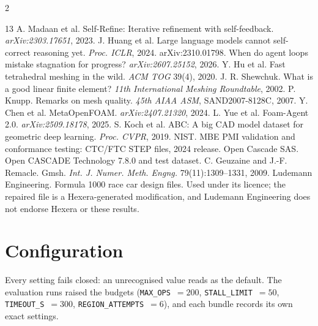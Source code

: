 \documentclass[10pt,onecolumn]{article}
\newcommand{\code}[1]{\texttt{\small #1}}
\begin{document}
\begin{multicols}{2}
\begin{thebibliography}{13}
\footnotesize
\setlength{\itemsep}{2pt}
 A. Madaan et al. Self-Refine: Iterative refinement with self-feedback.
  \emph{arXiv:2303.17651}, 2023.
 J. Huang et al. Large language models cannot self-correct reasoning yet.
  \emph{Proc. ICLR}, 2024. arXiv:2310.01798.
 When do agent loops mistake stagnation for progress? \emph{arXiv:2607.25152}, 2026.
 Y. Hu et al. Fast tetrahedral meshing in the wild. \emph{ACM TOG} 39(4), 2020.
 J. R. Shewchuk. What is a good linear finite element? \emph{11th International
  Meshing Roundtable}, 2002.
 P. Knupp. Remarks on mesh quality. \emph{45th AIAA ASM}, SAND2007-8128C, 2007.
 Y. Chen et al. MetaOpenFOAM. \emph{arXiv:2407.21320}, 2024.
 L. Yue et al. Foam-Agent 2.0. \emph{arXiv:2509.18178}, 2025.
 S. Koch et al. ABC: A big CAD model dataset for geometric deep learning.
  \emph{Proc. CVPR}, 2019.
 NIST. MBE PMI validation and conformance testing: CTC/FTC STEP files, 2024 release.
 Open Cascade SAS. Open CASCADE Technology 7.8.0 and test dataset.
 C. Geuzaine and J.-F. Remacle. Gmsh. \emph{Int. J. Numer. Meth. Engng.}
  79(11):1309--1331, 2009.
 Ludemann Engineering. Formula 1000 race car design files. Used under its licence;
  the repaired file is a Hexera-generated modification, and Ludemann Engineering does not endorse
  Hexera or these results.
\end{thebibliography}
\end{multicols}

\appendix

\section{Configuration}\label{app:config}

Every setting fails closed: an unrecognised value reads as the default. The evaluation runs raised
the budgets (\code{MAX\_OPS}~$=200$, \code{STALL\_LIMIT}~$=50$, \code{TIMEOUT\_S}~$=300$,
\code{REGION\_ATTEMPTS}~$=6$), and each bundle records its own exact settings.
\end{document}
